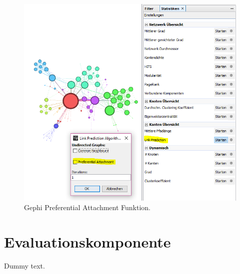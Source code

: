 \begin{figure}[htbp]
    \includegraphics[width=\linewidth]{resources/gephi-PA.png}
    \caption{Gephi Preferential Attachment Funktion.}
    \label{fig:screen9}
\end{figure}

\section{Evaluationskomponente}

Dummy text.
